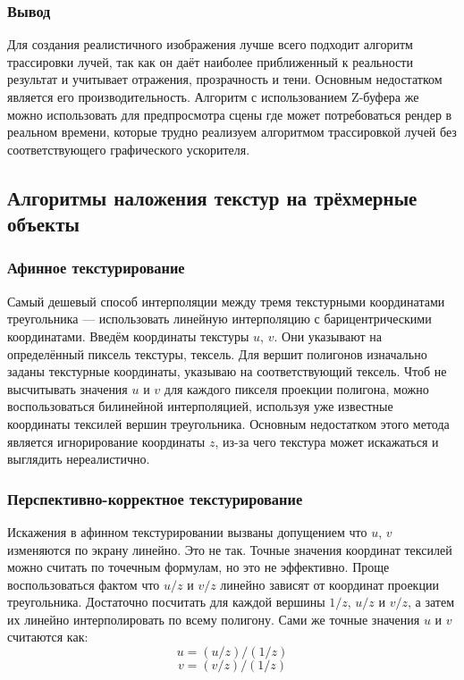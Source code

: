 \subsubsection{Вывод}

Для создания реалистичного изображения лучше всего подходит алгоритм трассировки лучей, так как он даёт наиболее приближенный к реальности результат и учитывает отражения, прозрачность и тени. Основным недостатком является его производительность. Алгоритм с использованием Z-буфера же можно использовать для предпросмотра сцены где может потребоваться рендер в реальном времени, которые трудно реализуем алгоритмом трассировкой лучей без соответствующего графического ускорителя.

\subsection{Алгоритмы наложения текстур на трёхмерные объекты}

\subsubsection{Афинное текстурирование}

Самый дешевый способ интерполяции между тремя текстурными координатами треугольника — использовать линейную интерполяцию с барицентрическими координатами. Введём координаты текстуры $u$, $v$. Они указывают на определённый пиксель текстуры, тексель. Для вершит полигонов изначально заданы текстурные координаты, указываю на соответствующий тексель. Чтоб не высчитывать значения $u$ и $v$ для каждого пикселя проекции полигона, можно воспользоваться билинейной интерполяцией, используя уже известные координаты тексилей вершин треугольника. Основным недостатком этого метода является игнорирование координаты $z$, из-за чего текстура может искажаться и выглядить нереалистично.

\subsubsection{Перспективно-корректное текстурирование}

Искажения в афинном текстурировании вызваны допущением что $u$, $v$ изменяются по экрану линейно. Это не так. Точные значения координат тексилей можно считать по точечным формулам, но это не эффективно. Проще воспользоваться фактом что $u/z$ и $v/z$ линейно зависят от координат проекции треугольника. Достаточно посчитать для каждой вершины $1/z$, $u/z$ и $v/z$, а затем их линейно интерполировать по всему полигону. Сами же точные значения $u$ и $v$ считаются как: \[ u=(u/z)/(1/z) \] \[ v=(v/z)/(1/z) \]


